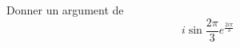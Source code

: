 Donner un argument de 
\begin{displaymath}
 i\sin \frac{2\pi}{3}e^{\frac{2i\pi}{3}}
\end{displaymath}
\bigskip \bigskip